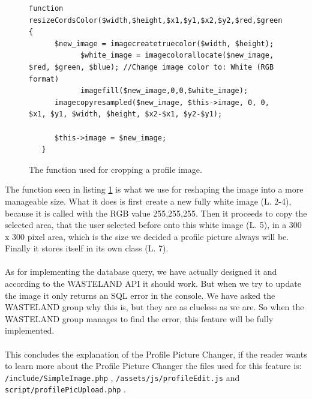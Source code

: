 \lstset{language=PHP}
\begin{figure}[htbp]
\begin{lstlisting}[firstline=1]
   function resizeCordsColor($width,$height,$x1,$y1,$x2,$y2,$red,$green,$blue) {
      $new_image = imagecreatetruecolor($width, $height);
			$white_image = imagecolorallocate($new_image, $red, $green, $blue); //Change image color to: White (RGB format)
			imagefill($new_image,0,0,$white_image);
      imagecopyresampled($new_image, $this->image, 0, 0, $x1, $y1, $width, $height, $x2-$x1, $y2-$y1);
	  
      $this->image = $new_image;
   }
\end{lstlisting}
\caption{The function used for cropping a profile image.}
\label{lst:croppingProfile}
\end{figure}

The function seen in listing \ref{lst:croppingProfile} is what we use for reshaping the image into a more manageable size. What it does is first create a new fully white image (L. 2-4), because it is called with the RGB value 255,255,255. Then it proceeds to copy the selected area, that the user selected before onto this white image (L. 5), in a 300 x 300 pixel area, which is the size we decided a profile picture always will be. Finally it stores itself in its own class (L. 7).\\
\\
As for implementing the database query, we have actually designed it and according to the WASTELAND API \citep{wastelandApi} it should work. But when we try to update the image it only returns an SQL error in the console. We have asked the WASTELAND group why this is, but they are as clueless as we are. So when the WASTELAND group manages to find the error, this feature will be fully implemented.\\
\\
This concludes the explanation of the Profile Picture Changer, if the reader wants to learn more about the Profile Picture Changer the files used for this feature is: \texttt{/include/SimpleImage.php} , \texttt{/assets/js/profileEdit.js} and \texttt{script/profilePicUpload.php} .









